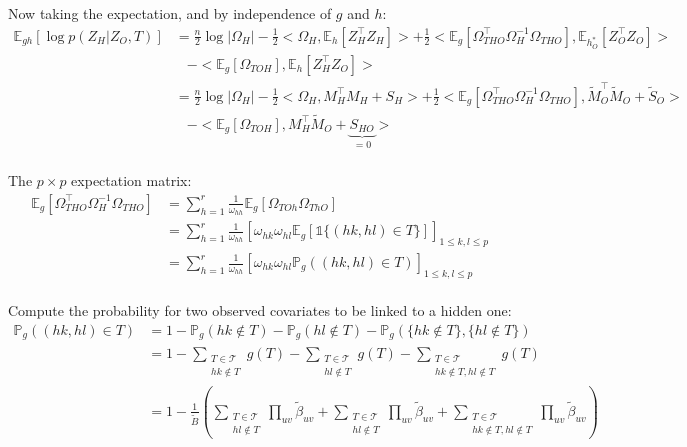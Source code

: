 \documentclass[11pt,a4paper]{article}
\newcommand{\Esp}{\mathds{E}}
\begin{document}
Now taking the expectation, and by independence of $g$ and $h$:
\begin{align*}
\Esp_{gh}[\log p(Z_H | Z_O,T) ] &=\frac{n}{2} \log |\Omega_H| -\frac{1}{2} <\Omega_H,\Esp_h[Z_H^\intercal Z_H]> +\frac{1}{2} <\Esp_g[\Omega_{THO}^\intercal \Omega_H^{-1}\Omega_{THO}],\Esp_{h_O^*}[Z_O^\intercal Z_O]> \\
&\;\;\; -<\Esp_g[\Omega_{TOH}],\Esp_h[Z_H^\intercal Z_O]>\\
&=\frac{n}{2} \log |\Omega_H|-\frac{1}{2} <\Omega_H,M_H^\intercal M_H + S_H> +\frac{1}{2} <\Esp_g[\Omega_{THO}^\intercal \Omega_H^{-1}\Omega_{THO}],\widetilde{M}_O^\intercal \widetilde{M}_O + \widetilde{S}_O>\\
&\;\;\; -<\Esp_g[\Omega_{TOH}],M_H^\intercal \widetilde{M}_O +  \underbrace{S_{HO}}_{=0}>
\end{align*}\\



The $p \times p$ expectation matrix:
\begin{align*}
\Esp_g[\Omega_{THO}^\intercal \Omega_H^{-1}\Omega_{THO}] &= \sum_{h=1}^r \frac{1}{\omega_{hh}} \Esp_g[\Omega_{TOh} \Omega_{ThO}]\\
&= \sum_{h=1}^r \frac{1}{\omega_{hh}} \left[ \omega_{hk}\omega_{hl}\Esp_g[\mathds{1}\{(hk,hl)\in T\}]\right]_{1\leq k,l\leq p}\\
&=\sum_{h=1}^r \frac{1}{\omega_{hh}} \left[ \omega_{hk}\omega_{hl}\mathds{P}_g((hk,hl)\in T)\right]_{1\leq k,l\leq p}
\end{align*}\\

Compute the probability for two observed covariates to be linked to a hidden one:
\begin{align*}
\mathds{P}_g((hk,hl)\in T)&= 1 - \mathds{P}_g(hk \notin T)- \mathds{P}_g(hl \notin T) - \mathds{P}_g( \{hk \notin T\}, \{hl \notin T\})\\
&=1-\sum_{\substack{T \in \mathcal{T}\\ hk \notin T}} g(T)-\sum_{\substack{T \in \mathcal{T}\\ hl \notin T}} g(T)-\sum_{\substack{T \in \mathcal{T}\\ hk \notin T, hl \notin T}} g(T)\\
&= 1- \frac{1}{\widetilde{B}} \left( \sum_{\substack{T \in \mathcal{T}\\ hl \notin T}} \prod_{uv} \widetilde{\beta}_{uv} +\sum_{\substack{T \in \mathcal{T}\\ hl \notin T}}\prod_{uv} \widetilde{\beta}_{uv} +\sum_{\substack{T \in \mathcal{T}\\ hk \notin T, hl \notin T}}\prod_{uv} \widetilde{\beta}_{uv} \right)
\end{align*}
\end{document}
